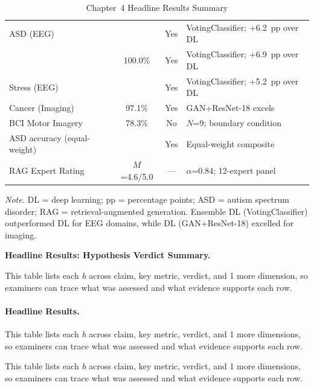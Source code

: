 \begin{table}[!htbp]
\tablestripes\tablefontsize
\caption{Chapter~4 Headline Results Summary}
\tablefontsize
\begin{tabularx}{\textwidth}{@{} L C C L @{}}
\toprule
{} &  &  &  \\
\midrule
ASD (EEG) & \asdacc{} & Yes & VotingClassifier; +6.2~pp over DL \\
& 100.0\% & Yes & VotingClassifier; +6.9~pp over DL \\
Stress (EEG) & \stressacc{} & Yes & VotingClassifier; +5.2~pp over DL \\
Cancer (Imaging) & 97.1\% & Yes & GAN+ResNet-18 excels \\
BCI Motor Imagery & 78.3\% & No & $N$=9; boundary condition \\
\addlinespace
ASD accuracy (equal-weight) & \asdacc{} & Yes & Equal-weight composite \\
RAG Expert Rating & $M$=4.6/5.0 & --- & $\alpha$=0.84; 12-expert panel \\
\bottomrule
\end{tabularx}
\vspace{0.5em}\noindent\textit{Note.} DL = deep learning; pp = percentage points; ASD = autism spectrum disorder;   RAG = retrieval-augmented generation. Ensemble DL (VotingClassifier) outperformed DL for EEG domains, while DL (GAN+ResNet-18) excelled for imaging.
\end{table}
\fi %


\noindent\textbf{Headline Results: Hypothesis Verdict Summary.}

\noindent This table lists each \textit{h} across claim, key metric, verdict, and 1 more dimension, so examiners can trace what was assessed and what evidence supports each row.

\paragraph{Headline Results.}







\noindent This table lists each \textit{h} across claim, key metric, verdict, and 1 more dimensions, so examiners can trace what was assessed and what evidence supports each row.


\noindent This table lists each \textit{h} across claim, key metric, verdict, and 1 more dimensions, so examiners can trace what was assessed and what evidence supports each row.



